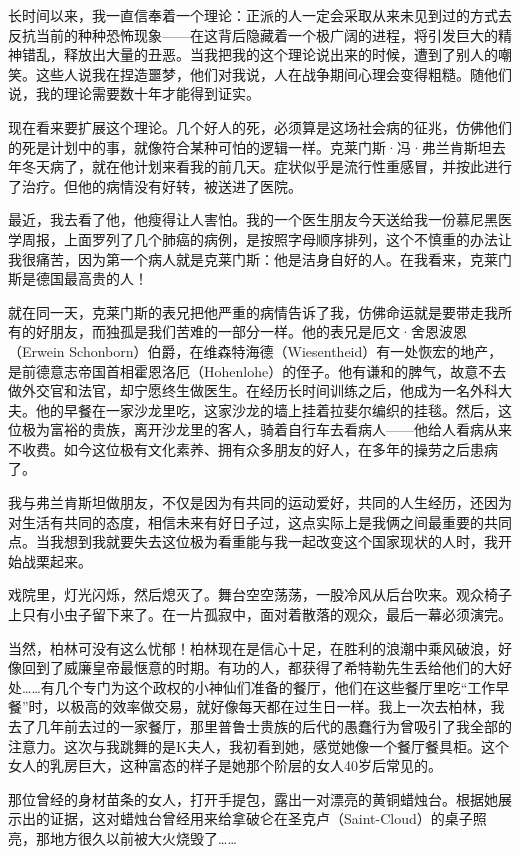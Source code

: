 \documentclass[UTF8]{ctexart}
\begin{document}
长时间以来，我一直信奉着一个理论：正派的人一定会采取从来未见到过的方式去反抗当前的种种恐怖现象——在这背后隐藏着一个极广阔的进程，将引发巨大的精神错乱，释放出大量的丑恶。当我把我的这个理论说出来的时候，遭到了别人的嘲笑。这些人说我在捏造噩梦，他们对我说，人在战争期间心理会变得粗糙。随他们说，我的理论需要数十年才能得到证实。

现在看来要扩展这个理论。几个好人的死，必须算是这场社会病的征兆，仿佛他们的死是计划中的事，就像符合某种可怕的逻辑一样。克莱门斯·冯·弗兰肯斯坦去年冬天病了，就在他计划来看我的前几天。症状似乎是流行性重感冒，并按此进行了治疗。但他的病情没有好转，被送进了医院。

最近，我去看了他，他瘦得让人害怕。我的一个医生朋友今天送给我一份慕尼黑医学周报，上面罗列了几个肺癌的病例，是按照字母顺序排列，这个不慎重的办法让我很痛苦，因为第一个病人就是克莱门斯：他是洁身自好的人。在我看来，克莱门斯是德国最高贵的人！

就在同一天，克莱门斯的表兄把他严重的病情告诉了我，仿佛命运就是要带走我所有的好朋友，而独孤是我们苦难的一部分一样。他的表兄是厄文·舍恩波恩（Erwein Schonborn）伯爵，在维森特海德（Wiesentheid）有一处恢宏的地产，是前德意志帝国首相霍恩洛厄（Hohenlohe）的侄子。他有谦和的脾气，故意不去做外交官和法官，却宁愿终生做医生。在经历长时间训练之后，他成为一名外科大夫。他的早餐在一家沙龙里吃，这家沙龙的墙上挂着拉斐尔编织的挂毯。然后，这位极为富裕的贵族，离开沙龙里的客人，骑着自行车去看病人——他给人看病从来不收费。如今这位极有文化素养、拥有众多朋友的好人，在多年的操劳之后患病了。

我与弗兰肯斯坦做朋友，不仅是因为有共同的运动爱好，共同的人生经历，还因为对生活有共同的态度，相信未来有好日子过，这点实际上是我俩之间最重要的共同点。当我想到我就要失去这位极为看重能与我一起改变这个国家现状的人时，我开始战栗起来。

戏院里，灯光闪烁，然后熄灭了。舞台空空荡荡，一股冷风从后台吹来。观众椅子上只有小虫子留下来了。在一片孤寂中，面对着散落的观众，最后一幕必须演完。

当然，柏林可没有这么忧郁！柏林现在是信心十足，在胜利的浪潮中乘风破浪，好像回到了威廉皇帝最惬意的时期。有功的人，都获得了希特勒先生丢给他们的大好处……有几个专门为这个政权的小神仙们准备的餐厅，他们在这些餐厅里吃“工作早餐”时，以极高的效率做交易，就好像每天都在过生日一样。我上一次去柏林，我去了几年前去过的一家餐厅，那里普鲁士贵族的后代的愚蠢行为曾吸引了我全部的注意力。这次与我跳舞的是K夫人，我初看到她，感觉她像一个餐厅餐具柜。这个女人的乳房巨大，这种富态的样子是她那个阶层的女人40岁后常见的。

那位曾经的身材苗条的女人，打开手提包，露出一对漂亮的黄铜蜡烛台。根据她展示出的证据，这对蜡烛台曾经用来给拿破仑在圣克卢（Saint-Cloud）的桌子照亮，那地方很久以前被大火烧毁了……
\end{document}
